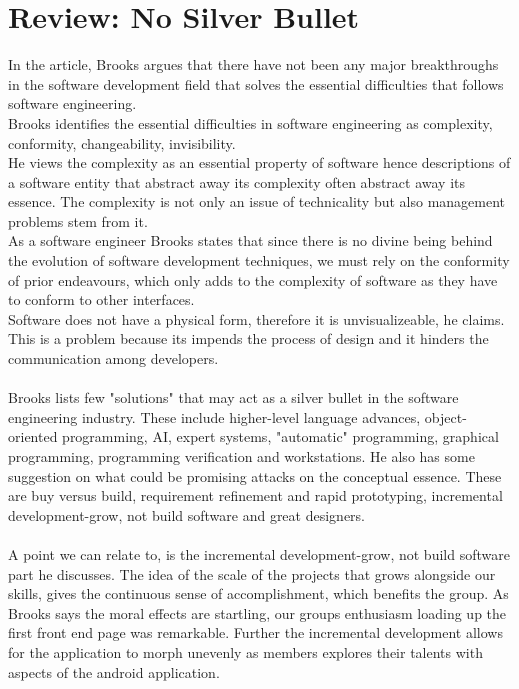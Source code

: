 \message{ !name(Rapport.tex)}\documentclass[12pt]{article}
\begin{document}
\section{Review: No Silver Bullet}
\label{Review2}
In the article, Brooks argues that there have not been any major breakthroughs in the software development field that solves the essential difficulties that follows software engineering.\\
Brooks identifies the essential difficulties in software engineering as complexity, conformity, changeability, invisibility.\\
He views the complexity as an essential property of software hence descriptions of a software entity that abstract away its complexity often abstract away its essence. The complexity is not only an issue of technicality but also management problems stem from it.\\
As a software engineer Brooks states that since there is no divine being behind the evolution of software development techniques, we must rely on the conformity of prior endeavours, which only adds to the complexity of software as they have to conform to other interfaces.\\
Software does not have a physical form, therefore it is unvisualizeable, he claims. This is a problem because its impends the process of design and it hinders the communication among developers.\\ \\
Brooks lists few "solutions" that may act as a silver bullet in the software engineering industry. These include higher-level language advances, object-oriented programming, AI, expert systems, "automatic" programming, graphical programming, programming verification and workstations. He also has some suggestion on what could be promising attacks on the conceptual essence. These are buy versus build, requirement refinement and rapid prototyping, incremental development-grow, not build software and great designers.\\ \\
A point we can relate to, is the incremental development-grow, not build software part he discusses. The idea of the scale of the projects that grows alongside  our skills, gives the continuous sense of accomplishment, which benefits the group. As Brooks says the moral effects are startling, our groups enthusiasm loading up the first front end page was remarkable. Further the incremental development allows for the application to morph unevenly as members explores their talents with aspects of the android application.\\
\end{document}
